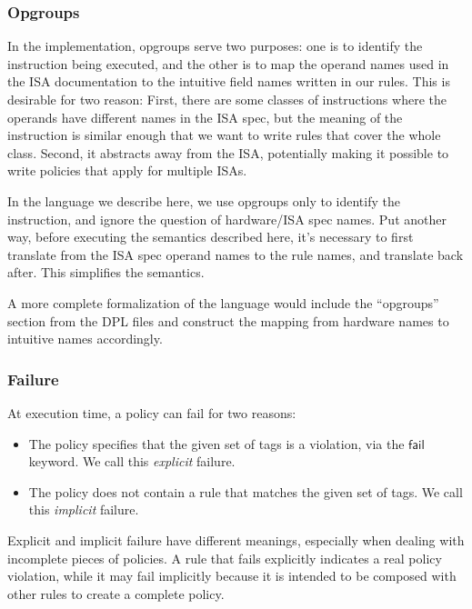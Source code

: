 \documentclass[12pt]{article}
\begin{document}
\subsubsection{Opgroups} 

\label{sec:opgroups}

In the implementation, opgroups serve two purposes: one
is to identify the instruction being executed, and the other is to map the
operand names used in the ISA documentation to the intuitive field names written
in our rules.  This is desirable for two reason: First, there are some classes
of instructions where the operands have different names in the ISA spec, but the
meaning of the instruction is similar enough that we want to write rules that
cover the whole class.  Second, it abstracts away from the ISA, potentially
making it possible to write policies that apply for multiple ISAs.

In the language we describe here, we use opgroups only to identify the
instruction, and ignore the question of hardware/ISA spec names.  Put another
way, before executing the semantics described here, it's necessary to first
translate from the ISA spec operand names to the rule names, and translate back
after.  This simplifies the semantics.

A more complete formalization of the language would include the ``opgroups''
section from the DPL files and construct the mapping from hardware names to
intuitive names accordingly.

\subsubsection{Failure}
\label{sec:failure}

At execution time, a policy can fail for two reasons:

\begin{itemize}
\item The policy specifies that the given set of tags is a violation, via the
  $\mathsf{fail}$ keyword.  We call this {\em explicit} failure.
\item The policy does not contain a rule that matches the given set of tags.
  We call this {\em implicit} failure.
\end{itemize}

Explicit and implicit failure have different meanings, especially when dealing
with incomplete pieces of policies.  A rule that fails explicitly indicates a
real policy violation, while it may fail implicitly because it is intended to be
composed with other rules to create a complete policy.
\end{document}
